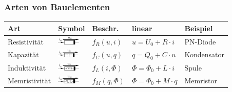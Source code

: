\documentclass[fs, footer]{latex4ei}
\begin{document}
\begin{multicols*}{4}
		\subsubsection{Arten von Bauelementen}
		\begin{tabular}{l|l|l|l|l}
			Art & Symbol & Beschr. & linear & Beispiel\\ \hline
			Resistivität & \includegraphics[height=0.4cm]{./img/Resistivitat.pdf} & $f_R(u,i)$  & $u = U_0 + R \cdot i$ & PN-Diode\\
			Kapazität & \includegraphics[height=0.4cm]{./img/Kapazivitat.pdf} & $f_C(u,q)$ & $q = Q_0 + C \cdot u$ & Kondensator\\ 
			Induktivität & \includegraphics[height=0.4cm]{./img/Induktivitat.pdf} & $f_L(i,\Phi)$ & $\Phi = \Phi_0 + L \cdot i$ & Spule\\
			Memristivität & \includegraphics[height=0.4cm]{./img/Memristivitat.pdf} & $f_M(q,\Phi)$ & $\Phi = \Phi_0 + M \cdot q$ & Memristor\\
		\end{tabular}





\sectionbox{	
}
\end{multicols*}
\end{document}
